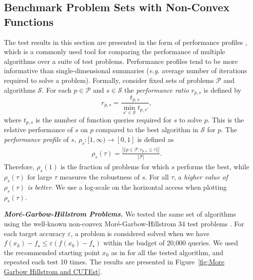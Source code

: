 \subsection{Benchmark Problem Sets with Non-Convex Functions}
The test results in this section are presented in the form of performance profiles \cite{dolan2002benchmarking}, which is a commonly used tool for comparing the performance of multiple algorithms over a suite of test problems. Performance profiles tend to be more informative than single-dimensional summaries ({\em e.g.} average number of iterations required to solve a problem). Formally, consider fixed sets of problems $\mathcal{P}$ and algorithms $\mathcal{S}$. For each $p \in \mathcal{P}$ and $s \in \mathcal{S}$ the {\em performance ratio} $r_{p,s}$ is defined by
\begin{equation*}
    r_{p,s} = \frac{t_{p,s}}{\min_{s'\in\mathcal{S}} t_{p,s'}},
\end{equation*}
where $t_{p,s}$ is the number of function queries required for $s$ to solve $p$. This is the relative performance of $s$ on $p$ compared to the best algorithm in $\mathcal{S}$ for $p$. The {\em performance profile} of $s$, $\rho_{s} : [1,\infty) \rightarrow [0,1]$ is defined as
\begin{align*}
    \rho_s(\tau) = \frac{|\{p \in \mathcal{P} : r_{p,s} \leq \tau \}|}{|\mathcal{P}|}.
\end{align*}
Therefore, $\rho_s(1)$ is the fraction of problems for which $s$ performs the best, while $\rho_s(\tau)$ for large $\tau$ measures the robustness of $s$. For all $\tau$, a {\em higher value of $\rho_{s}(\tau)$ is better}. We use a log-scale on the horizontal access when plotting $\rho_s(\tau)$.

\vspace{0.1in}
\noindent\textit{\textbf{Mor\'{e}-Garbow-Hillstrom Problems.}}\quad
We tested the same set of algorithms using the well-known non-convex Mor\'{e}-Garbow-Hillstrom 34 test problems \cite{more1981testing}.
For each target accuracy $\varepsilon$, a problem is considered solved when we have $f(x_k)-f_\star \leq \varepsilon(f(x_0)-f_{\star})$ within the budget of 20,000 queries. We used the recommended starting point $x_0$ as in \cite{more1981testing} for all the tested algorithm, and repeated each test 10 times. The results are presented in Figure~\ref{fig:More Garbow Hillstrom and CUTEst}.

